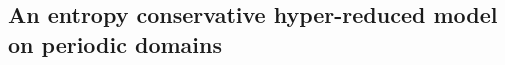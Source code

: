 \documentclass[preprint,10pt]{elsarticle}
\theoremstyle{definition}
\theoremstyle{lemma}
\theoremstyle{theorem}
\theoremstyle{assumption}
\newcommand{\LRp}[1]{\left( #1 \right)}
\newcommand{\note}[1]{{\color{blue}{#1}}}
\begin{document}



 
\subsection{An entropy conservative hyper-reduced model on periodic domains}
\end{document}
